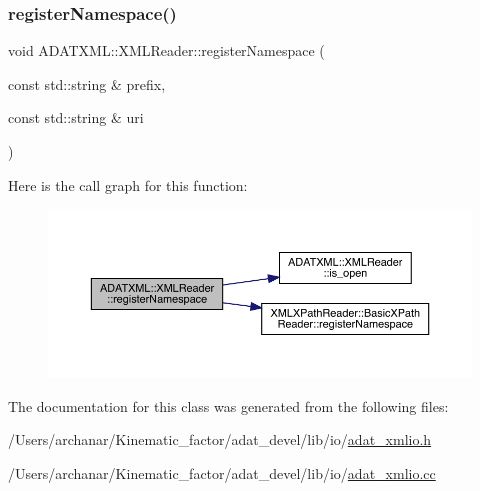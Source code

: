 \subsubsection{\texorpdfstring{registerNamespace()}{registerNamespace()}\hspace{0.1cm}{\footnotesize\ttfamily [2/2]}}
{\footnotesize\ttfamily void A\+D\+A\+T\+X\+M\+L\+::\+X\+M\+L\+Reader\+::register\+Namespace (\begin{DoxyParamCaption}\item[{const std\+::string \&}]{prefix,  }\item[{const std\+::string \&}]{uri }\end{DoxyParamCaption})\hspace{0.3cm}{\ttfamily [inline]}}

Here is the call graph for this function\+:
\nopagebreak
\begin{figure}[H]
\begin{center}
\leavevmode
\includegraphics[width=350pt]{db/d3f/classADATXML_1_1XMLReader_aeb735523fc1858850ae8a2be61a34189_cgraph}
\end{center}
\end{figure}


The documentation for this class was generated from the following files\+:\begin{DoxyCompactItemize}
\item 
/\+Users/archanar/\+Kinematic\+\_\+factor/adat\+\_\+devel/lib/io/\mbox{\hyperlink{lib_2io_2adat__xmlio_8h}{adat\+\_\+xmlio.\+h}}\item 
/\+Users/archanar/\+Kinematic\+\_\+factor/adat\+\_\+devel/lib/io/\mbox{\hyperlink{adat__xmlio_8cc}{adat\+\_\+xmlio.\+cc}}\end{DoxyCompactItemize}
